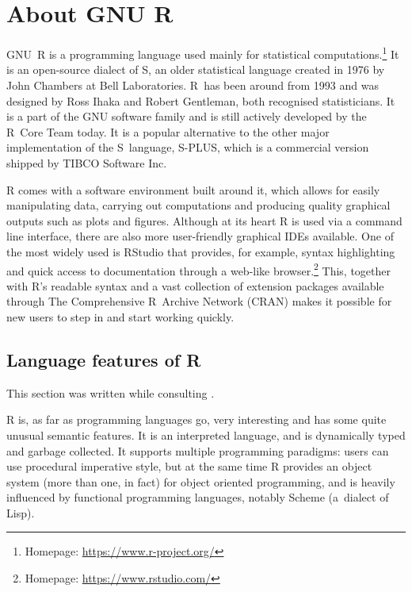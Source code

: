 \chapter{About GNU R\label{gnur}}

GNU~R \autocite{about} is a programming language used mainly for statistical computations.\footnote{Homepage: \url{https://www.r-project.org/}} It is an open-source dialect of S, an older statistical language created in 1976 by John Chambers at Bell Laboratories. R~has been around from 1993 and was designed by Ross Ihaka and Robert Gentleman, both recognised statisticians. It is a part of the GNU software family and is still actively developed by the R~Core Team today. It is a popular alternative to the other major implementation of the S~language, S-PLUS, which is a commercial version shipped by TIBCO Software Inc.

R comes with a software environment built around it, which allows for easily manipulating data, carrying out computations and producing quality graphical outputs such as plots and figures. Although at its heart R is used via a command line interface, there are also more user-friendly graphical IDEs available. One of the most widely used is RStudio that provides, for example, syntax highlighting and quick access to documentation through a web-like browser.\footnote{Homepage: \url{https://www.rstudio.com/}} This, together with R's readable syntax and a vast collection of extension packages available through The Comprehensive R~Archive Network (CRAN) makes it possible for new users to step in and start working quickly.


\section{Language features of R}

This section was written while consulting \autocite{hadley, design, inferno, rint, rlang}.

R is, as far as programming languages go, very interesting and has some quite unusual semantic features. It is an interpreted language, and is dynamically typed and garbage collected. It supports multiple programming paradigms: users can use procedural imperative style, but at the same time R provides an object system (more than one, in fact) for object oriented programming, and is heavily influenced by functional programming languages, notably Scheme (a~dialect of Lisp).

